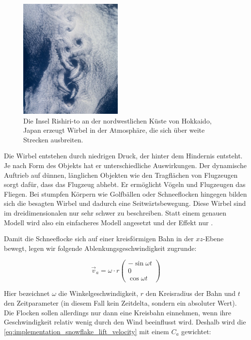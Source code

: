 \begin{figure}[ht]
    \centering
    \includegraphics{images/vortex_shedding_macroscopic}
    \caption{Die Insel Rishiri-to an der nordwestlichen Küste von Hokkaido, Japan erzeugt Wirbel in der Atmosphäre, die sich über weite Strecken ausbreiten.}
    \label{fig:implementation_snowflake_vortex_shedding_macroscopic}
\end{figure}

Die Wirbel entstehen durch niedrigen Druck, der hinter dem Hindernis
entsteht. Je nach Form des Objekts hat er unterschiedliche
Auswirkungen. Der dynamische Auftrieb auf dünnen, länglichen Objekten
wie den Tragflächen von Flugzeugen sorgt dafür, dass das Flugzeug
abhebt. Er ermöglicht Vögeln und Flugzeugen das Fliegen. Bei stumpfen
Körpern wie Golfbällen oder Schneeflocken hingegen bilden sich die
besagten Wirbel und dadurch eine Seitwärtsbewegung. Diese Wirbel sind
im dreidimensionalen nur sehr schwer zu beschreiben. Statt einem
genauen Modell wird also ein einfacheres Modell angesetzt und der
Effekt nur .

Damit die Schneeflocke sich auf einer kreisförmigen Bahn in der
$xz$-Ebene bewegt, legen wir folgende Ablenkungsgeschwindigkeit zugrunde:

\begin{equation}
\label{eq:implementation_snowflake_lift_velocity}
\vec{v}_{a} =
\omega \cdot r
\left(
\begin{array}{c}
-\sin{\omega t} \\
0 \\
\cos{\omega t}
\end{array}
\right)
\end{equation}

Hier bezeichnet $\omega$ die Winkelgeschwindigkeit, $r$ den
Kreisradius der Bahn und $t$ den Zeitparameter (in diesem Fall kein
Zeitdelta, sondern ein absoluter Wert). Die Flocken sollen allerdings
nur dann eine Kreisbahn einnehmen, wenn ihre Geschwindigkeit relativ
wenig durch den Wind beeinflusst wird. Deshalb wird die
\autoref{eq:implementation_snowflake_lift_velocity} mit einem $C_a$
gewichtet:

